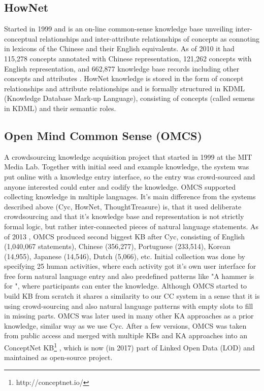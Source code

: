 \subsection{HowNet}
\label{section:r:hownet}
Started in 1999 and is an on-line common-sense knowledge base 
unveiling inter-conceptual relationships and inter-attribute relationships of 
concepts as connoting in lexicons of the Chinese and their English equivalents. 
As of 2010 it had 115,278 concepts annotated with Chinese representation, 
121,262 concepts with English representation, and 662,877 knowledge base records
including other concepts and attributes \parencite{Dong2010}. HowNet knowledge 
is stored in the form of concept relationships and attribute relationships and 
is formally structured in KDML (Knowledge Database Mark-up Language), consisting
of concepts (called semens in KDML) and their semantic roles.
 
\subsection{Open Mind Common Sense (OMCS)}
\label{section:r:omcs}
A crowdsourcing knowledge acquisition 
project that started in 1999 at the MIT Media Lab\parencite{Singh2002a}. 
Together with initial seed and example knowledge, the system was put online with
a knowledge entry interface, so the entry was crowd-sourced and anyone 
interested could enter and codify the knowledge. OMCS supported collecting 
knowledge in multiple languages. It's main difference from the systems described
above (Cyc, HowNet, ThoughtTreasure) is, that it used deliberate crowdsourcing
and that it's knowledge base and representation is not strictly formal logic, 
but rather inter-connected pieces of natural language statements. As of 2013 
\parencite{Zang2013}, OMCS produced second biggest KB after Cyc, consisting of 
English (1,040,067 statements), Chinese (356,277), Portuguese (233,514), 
Korean (14,955), Japanese (14,546), Dutch (5,066), etc. Initial collection was
done by specifying 25 human activities, where each activity got it's own user 
interface for free form natural language entry and also predefined patterns 
like "A hammer is for \underline{\hspace{1.0cm}}", where participants can enter
the knowledge. Although OMCS started to build KB from scratch it shares a 
similarity to our CC system in a sense that it is using crowd-sourcing and also
natural language patterns with empty slots to fill in missing parts. OMCS was
later used in many other KA approaches as a prior knowledge, similar way as we 
use Cyc. After a few versions, OMCS was taken from public access and merged with
multiple KBs and KA approaches into an ConceptNet 
KB\footnote{http://conceptnet.io/} \parencite{Speer2016}, which is now (in 2017)
part of Linked Open Data (LOD) and maintained as open-source project.

